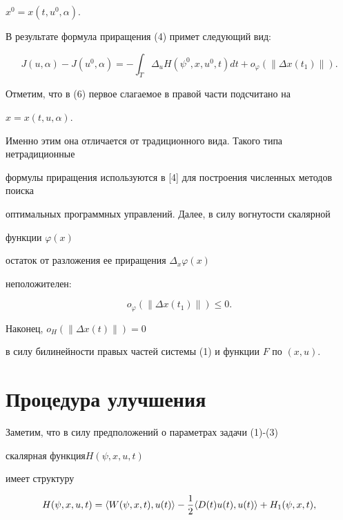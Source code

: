 $x^0=x(t,u^0,\alpha)$.





В результате формула приращения (4) примет следующий вид:


\begin{equation}


J(u,\alpha)-J(u^0,\alpha)=-\int_T \Delta_u H(\psi^0,x,u^0,t)dt+


o_{\varphi}(\| \Delta x(t_1)\|).


\end{equation}


Отметим, что в (6) первое слагаемое в правой части подсчитано на 


$x=x(t,u,\alpha)$.


Именно этим она отличается от традиционного вида. Такого типа нетрадиционные 


формулы приращения используются в [4] для построения численных методов поиска 


оптимальных программных управлений. Далее, в силу вогнутости скалярной 


функции $\varphi (x)$


остаток от разложения ее приращения $\Delta_x \varphi(x)$


неположителен:


\begin{equation}


o_{\varphi}(\| \Delta x(t_1)\|)\leq 0.


\end{equation}


Наконец, $o_H (\| \Delta x(t) \|)=0$


в силу билинейности правых частей системы (1) и функции $F$ по $(x,u)$.





\section{Процедура улучшения}





Заметим, что в силу предположений о параметрах задачи (1)-(3) 


скалярная функция\linebreak $H(\psi,x,u,t)$


имеет структуру


\begin{equation}


H(\psi,x,u,t)=\la W(\psi,x,t),u(t)\ra


-\frac{1}{2}\la D(t)u(t),u(t)\ra +H_1(\psi,x,t),


\end{equation}



